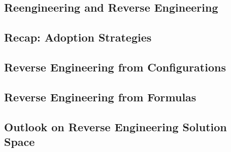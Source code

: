 \subsection{Reengineering and Reverse Engineering}
\subsection{Recap: Adoption Strategies}
\subsection{Reverse Engineering from Configurations}
\subsection{Reverse Engineering from Formulas}
\subsection{Outlook on Reverse Engineering Solution Space}
